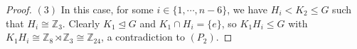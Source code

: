 \documentclass[10pt,a4paper]{amsart}
\begin{document}
\begin{proof}
    




$(3)$ In this case, for some $i\in\{1,\cdots,n-6\}$,  we have $H_i< K_2\leq G$  such that $H_{i} \cong \mathbb{ Z}_3$. Clearly $K_1\trianglelefteq G$ and $K_1 \cap H_{i}= \{e\}$, so $K_1H_i\leq G$ with $K_1H_i\cong \mathbb{Z}_{8}\rtimes \mathbb{Z}_{3}\cong \mathbb{Z}_{24}$, a contradiction to $(P_2)$.
\end{proof} 
\end{document}
